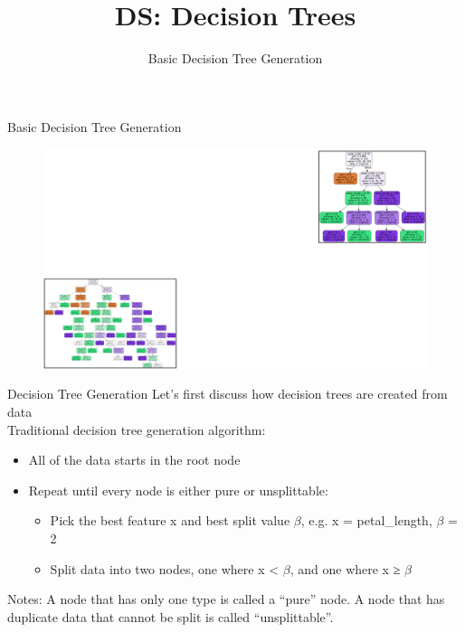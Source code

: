 \documentclass[aspectratio=169]{../latex_main/tntbeamer}  %
\title[Introduction]{DS: Decision Trees}
\subtitle{Basic Decision Tree Generation}
\begin{document}
	
	\maketitle
	\begin{frame}{Basic Decision Tree Generation}
	    \begin{figure}
	        \centering
	        \includegraphics[scale=.3]{Bild40}
	    \end{figure}
	\end{frame}
	
	\begin{frame}{Decision Tree Generation}
	    Let’s first discuss how decision trees are created from data\\
	    \bigskip
	    Traditional decision tree generation algorithm: 
	    \begin{itemize}
	        \item All of the data starts in the root node
	        \item Repeat until every node is either pure or unsplittable:
	        \begin{itemize}
	            \item Pick the best feature x and best split value $\beta$, e.g. x = petal\_length, $\beta$ = 2
	            \item Split data into two nodes, one where x < $\beta$, and one where x ≥ $\beta$
	        \end{itemize}
	    \end{itemize}
	    
	    
Notes: A node that has only one type is called a “pure” node. A node that has duplicate data that cannot be split is called “unsplittable”.

	\end{frame}
	
\end{document}
